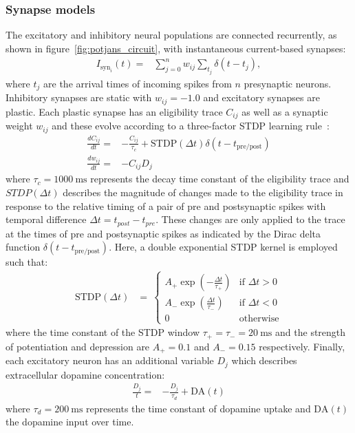 \documentclass[utf8]{frontiersSCNS} %
\begin{document}
\subsubsection{Synapse models}
The excitatory and inhibitory neural populations are connected recurrently, as shown in figure~\ref{fig:potjans_circuit}, with instantaneous current-based synapses:
%
\begin{align}
    I_{\text{syn}_{i}}(t) = & \sum_{j=0}^{n} w_{ij} \sum_{t_{j}}  \delta(t - t_{j}), \label{eq:delta_synapse}
\end{align}
%
where $t_{j}$ are the arrival times of incoming spikes from $n$ presynaptic neurons.
Inhibitory synapses are static with $w_{ij} = -1.0$ and excitatory synapses are plastic.
Each plastic synapse has an eligibility trace $C_{ij}$ as well as a synaptic weight $w_{ij}$ and these evolve according to a three-factor STDP learning rule~\citep{Izhikevich2007}:
%
\begin{align}
    \frac{dC_{ij}}{dt} = & -\frac{C_{ij}}{\tau_c} + \text{STDP}(\Delta t)\delta(t - t_\text{pre/post}) \label{eq:izhikevich_stdp_c} \\
    \frac{dw_{ij}}{dt} = & -C_{ij}D_j \label{eq:izhikevich_stdp_w}
\end{align}
%
where $\tau_c=\SI{1000}{\milli\second}$ represents the decay time constant of the eligibility trace and $STDP(\Delta t)$ describes the magnitude of changes made to the eligibility trace in response to the relative timing of a pair of pre and postsynaptic spikes with temporal difference $\Delta t=t_{post}-t_{pre}$.
These changes are only applied to the trace at the times of pre and postsynaptic spikes as indicated by the Dirac delta function $\delta(t-t_\text{pre/post})$.
Here, a double exponential STDP kernel is employed such that:
%
\begin{align}
    \text{STDP}(\Delta t) & = \
        \begin{cases}
          A_{+}\exp\left(-\frac{\Delta t}{\tau_{+}}\right)  & \text{if } \Delta t>0 \\
          A_{-}\exp\left(\frac{\Delta t}{\tau_{-}}\right)   & \text{if } \Delta t<0 \\
          0                                                 & \text{otherwise}
        \end{cases} \label{eq:stdp_pair}
\end{align}
%
where the time constant of the STDP window $\tau_{+}=\tau_{-}=\SI{20}{\milli\second}$ and the strength of potentiation and depression are $A_{+}=0.1$ and $A_{-}=0.15$ respectively.
Finally, each excitatory neuron has an additional variable $D_j$ which describes extracellular dopamine concentration:
%
\begin{align}
    \frac{D_{j}}{t} = & -\frac{D_{j}}{\tau_d} + \text{DA}(t) \label{eq:izhikevich_stdp_d}
\end{align}
%
where $\tau_d=\SI{200}{\milli\second}$ represents the time constant of dopamine uptake and $\text{DA}(t)$ the dopamine input over time.
\end{document}
